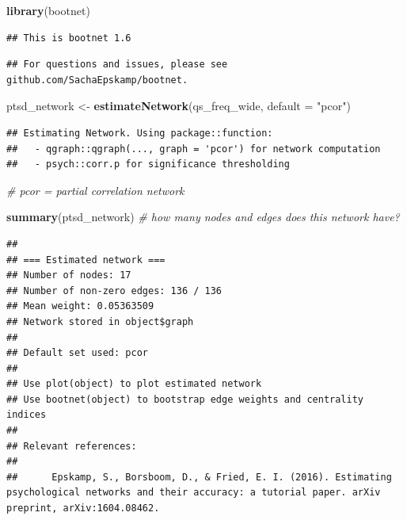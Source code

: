 \documentclass[
]{book}
\newenvironment{Shaded}{\begin{snugshade}}{\end{snugshade}}
\newcommand{\AttributeTok}[1]{\textcolor[rgb]{0.13,0.29,0.53}{#1}}
\newcommand{\CommentTok}[1]{\textcolor[rgb]{0.56,0.35,0.01}{\textit{#1}}}
\newcommand{\FunctionTok}[1]{\textcolor[rgb]{0.13,0.29,0.53}{\textbf{#1}}}
\newcommand{\NormalTok}[1]{#1}
\newcommand{\OtherTok}[1]{\textcolor[rgb]{0.56,0.35,0.01}{#1}}
\newcommand{\StringTok}[1]{\textcolor[rgb]{0.31,0.60,0.02}{#1}}
\begin{document}
\begin{Shaded}
\begin{Highlighting}[]
\FunctionTok{library}\NormalTok{(bootnet)}
\end{Highlighting}
\end{Shaded}

\begin{verbatim}
## This is bootnet 1.6
\end{verbatim}

\begin{verbatim}
## For questions and issues, please see github.com/SachaEpskamp/bootnet.
\end{verbatim}

\begin{Shaded}
\begin{Highlighting}[]
\NormalTok{ptsd\_network }\OtherTok{\textless{}{-}} \FunctionTok{estimateNetwork}\NormalTok{(qs\_freq\_wide, }\AttributeTok{default =} \StringTok{"pcor"}\NormalTok{) }
\end{Highlighting}
\end{Shaded}

\begin{verbatim}
## Estimating Network. Using package::function:
##   - qgraph::qgraph(..., graph = 'pcor') for network computation
##   - psych::corr.p for significance thresholding
\end{verbatim}

\begin{Shaded}
\begin{Highlighting}[]
\CommentTok{\# pcor = partial correlation network}

\FunctionTok{summary}\NormalTok{(ptsd\_network) }\CommentTok{\# how many nodes and edges does this network have?}
\end{Highlighting}
\end{Shaded}

\begin{verbatim}
## 
## === Estimated network ===
## Number of nodes: 17 
## Number of non-zero edges: 136 / 136 
## Mean weight: 0.05363509 
## Network stored in object$graph 
##  
## Default set used: pcor 
##  
## Use plot(object) to plot estimated network 
## Use bootnet(object) to bootstrap edge weights and centrality indices 
## 
## Relevant references:
## 
##      Epskamp, S., Borsboom, D., & Fried, E. I. (2016). Estimating psychological networks and their accuracy: a tutorial paper. arXiv preprint, arXiv:1604.08462.
\end{verbatim}
\end{document}
